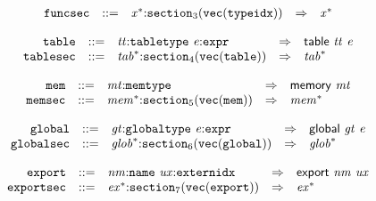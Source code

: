 \vspace{1ex}

$$
\begin{array}{@{}l@{}rrlll@{}l@{}}
& {\mathtt{funcsec}} &::=& {{\mathit{x}}^\ast}{:}{{\mathtt{section}}}_{3}({\mathtt{vec}}({\mathtt{typeidx}})) &\Rightarrow& {{\mathit{x}}^\ast} \\
\end{array}
$$

\vspace{1ex}

$$
\begin{array}{@{}l@{}rrlll@{}l@{}}
& {\mathtt{table}} &::=& {\mathit{tt}}{:}{\mathtt{tabletype}}~{\mathit{e}}{:}{\mathtt{expr}} &\Rightarrow& \mathsf{table}~{\mathit{tt}}~{\mathit{e}} \\
& {\mathtt{tablesec}} &::=& {{\mathit{tab}}^\ast}{:}{{\mathtt{section}}}_{4}({\mathtt{vec}}({\mathtt{table}})) &\Rightarrow& {{\mathit{tab}}^\ast} \\
\end{array}
$$

\vspace{1ex}

$$
\begin{array}{@{}l@{}rrlll@{}l@{}}
& {\mathtt{mem}} &::=& {\mathit{mt}}{:}{\mathtt{memtype}} &\Rightarrow& \mathsf{memory}~{\mathit{mt}} \\
& {\mathtt{memsec}} &::=& {{\mathit{mem}}^\ast}{:}{{\mathtt{section}}}_{5}({\mathtt{vec}}({\mathtt{mem}})) &\Rightarrow& {{\mathit{mem}}^\ast} \\
\end{array}
$$

\vspace{1ex}

$$
\begin{array}{@{}l@{}rrlll@{}l@{}}
& {\mathtt{global}} &::=& {\mathit{gt}}{:}{\mathtt{globaltype}}~{\mathit{e}}{:}{\mathtt{expr}} &\Rightarrow& \mathsf{global}~{\mathit{gt}}~{\mathit{e}} \\
& {\mathtt{globalsec}} &::=& {{\mathit{glob}}^\ast}{:}{{\mathtt{section}}}_{6}({\mathtt{vec}}({\mathtt{global}})) &\Rightarrow& {{\mathit{glob}}^\ast} \\
\end{array}
$$

\vspace{1ex}

$$
\begin{array}{@{}l@{}rrlll@{}l@{}}
& {\mathtt{export}} &::=& {\mathit{nm}}{:}{\mathtt{name}}~{\mathit{ux}}{:}{\mathtt{externidx}} &\Rightarrow& \mathsf{export}~{\mathit{nm}}~{\mathit{ux}} \\
& {\mathtt{exportsec}} &::=& {{\mathit{ex}}^\ast}{:}{{\mathtt{section}}}_{7}({\mathtt{vec}}({\mathtt{export}})) &\Rightarrow& {{\mathit{ex}}^\ast} \\
\end{array}
$$

